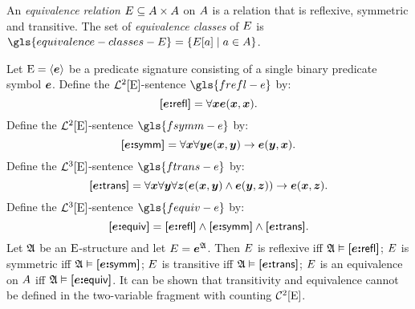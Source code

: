 An \emph{equivalence relation} $\relE \subseteq \domAA$ on $\domA$
is a relation that is reflexive, symmetric and transitive.
The set of \emph{equivalence classes} of $\relE$ is
$\gls{equivalence-classes-E} = \setbd{\relE[\ea]}{\ea \in \domA}$.

Let $\ES = \seq{\se}$ be a predicate signature consisting of a single binary
predicate symbol $\se$.
Define the $\vFoF2\ES$-sentence $\gls{frefl-e}$ by:
\[
  \frefl\se = \forall\xx \se(\xx,\xx).
\]
Define the $\vFoF2\ES$-sentence $\gls{fsymm-e}$ by:
\[
  \fsymm\se = \forall\xx\forall\yy \se(\xx,\yy) \limp \se(\yy, \xx).
\]
Define the $\vFoF3\ES$-sentence $\gls{ftrans-e}$ by:
\[
  \ftrans\se = \forall\xx\forall\yy\forall\zz (\se(\xx,\yy) \land \se(\yy,\zz))
  \limp \se(\xx,\zz).
\]
Define the $\vFoF3\ES$-sentence $\gls{fequiv-e}$ by:
\[
  \fequiv\se = \frefl\se \land \fsymm\se \land \ftrans\se.
\]
Let $\StrA$ be an $\ES$-structure and let $\relE = \se^\StrA$.
Then $\relE$ is reflexive iff $\StrA \vDash \frefl\se$;
$\relE$ is symmetric iff $\StrA \vDash \fsymm\se$;
$\relE$ is transitive iff $\StrA \vDash \ftrans\se$;
$\relE$ is an equivalence on $\domA$ iff $\StrA \vDash \fequiv\se$.
It can be shown that transitivity and equivalence cannot be defined in the
two-variable fragment with counting $\vFocF2\ES$.